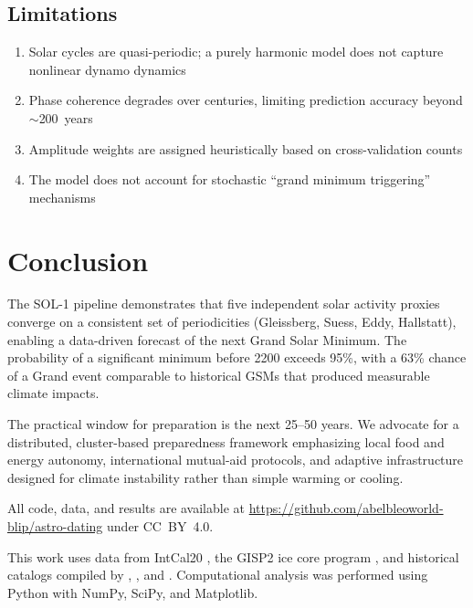 \documentclass[twocolumn,preprintnumbers,amsmath,amssymb]{revtex4-2}
\begin{document}
\subsection{Limitations}

\begin{enumerate}
    \item Solar cycles are quasi-periodic; a purely harmonic model does not capture nonlinear dynamo dynamics
    \item Phase coherence degrades over centuries, limiting prediction accuracy beyond $\sim$200~years
    \item Amplitude weights are assigned heuristically based on cross-validation counts
    \item The model does not account for stochastic ``grand minimum triggering'' mechanisms
\end{enumerate}

\section{Conclusion}
\label{sec:conclusion}

The SOL-1 pipeline demonstrates that five independent solar activity proxies converge on a consistent set of periodicities (Gleissberg, Suess, Eddy, Hallstatt), enabling a data-driven forecast of the next Grand Solar Minimum. The probability of a significant minimum before 2200 exceeds 95\%, with a 63\% chance of a Grand event comparable to historical GSMs that produced measurable climate impacts.

The practical window for preparation is the next 25--50 years. We advocate for a distributed, cluster-based preparedness framework emphasizing local food and energy autonomy, international mutual-aid protocols, and adaptive infrastructure designed for climate instability rather than simple warming or cooling.

All code, data, and results are available at \url{https://github.com/abelbleoworld-blip/astro-dating} under CC~BY~4.0.

\begin{acknowledgments}
This work uses data from IntCal20 \citep{Reimer2020}, the GISP2 ice core program \citep{Finkel1997}, and historical catalogs compiled by \citet{Yau1988}, \citet{Silverman1992}, and \citet{Stephenson1997}. Computational analysis was performed using Python with NumPy, SciPy, and Matplotlib.
\end{acknowledgments}


\end{document}
